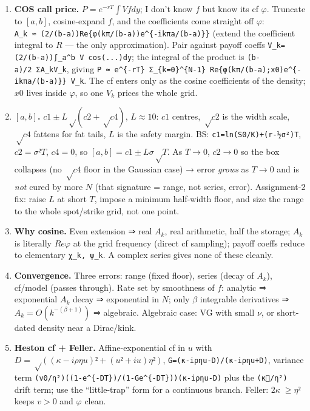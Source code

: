 \documentclass[
  11pt,
]{article}
\begin{document}
\begin{enumerate}
\def\labelenumi{\arabic{enumi}.}
\item
  \textbf{COS call price.} \(P = e^{-rT}∫V f dy\); I don't know \(f\)
  but know its cf \(φ\). Truncate to \([a,b]\), cosine-expand \(f\), and
  the coefficients come straight off \(φ\):
  \texttt{A\_k\ ≈\ (2/(b-a))Re\{φ(kπ/(b-a))e\^{}\{-ikπa/(b-a)\}\}}
  (extend the coefficient integral to \(R\) --- the only approximation).
  Pair against payoff coeffs
  \texttt{V\_k=(2/(b-a))∫\_a\^{}b\ V\ cos(...)dy}; the integral of the
  product is \texttt{(b-a)/2\ Σ\textquotesingle{}A\_kV\_k}, giving
  \texttt{P\ ≈\ e\^{}\{-rT\}\ Σ\textquotesingle{}\_\{k=0\}\^{}\{N-1\}\ Re\{φ(kπ/(b-a);x0)e\^{}\{-ikπa/(b-a)\}\}\ V\_k}.
  The cf enters only as the cosine coefficients of the density; \(x0\)
  lives inside \(φ\), so one \({V_k}\) prices the whole grid.
\item
  \textbf{\([a,b]\).} \(c1 ± L√(c2+√c4)\), \(L≈10\): \(c1\) centres,
  \(√c2\) is the width scale, \(√c4\) fattens for fat tails, \(L\) is
  the safety margin. BS: \texttt{c1=ln(S0/K)+(r-½σ²)T}, \(c2=σ²T\),
  \(c4=0\), so \([a,b]=c1±Lσ√T\). As \(T→0\), \(c2→0\) so the box
  collapses (no \(√c4\) floor in the Gaussian case) → error \emph{grows}
  as \(T→0\) and is \emph{not} cured by more \(N\) (that signature =
  range, not series, error). Assignment-2 fix: raise \(L\) at short
  \(T\), impose a minimum half-width floor, and size the range to the
  whole spot/strike grid, not one point.
\item
  \textbf{Why cosine.} Even extension ⇒ real \(A_k\), real arithmetic,
  half the storage; \(A_k\) is literally \(Re{φ}\) at the grid frequency
  (direct cf sampling); payoff coeffs reduce to elementary
  \texttt{χ\_k,\ ψ\_k}. A complex series gives none of these cleanly.
\item
  \textbf{Convergence.} Three errors: range (fixed floor), series (decay
  of \(A_k\)), cf/model (passes through). Rate set by smoothness of
  \(f\): analytic ⇒ exponential \(A_k\) decay ⇒ exponential in \(N\);
  only \(β\) integrable derivatives ⇒ \(A_k=O(k^{-(β+1)})\) ⇒ algebraic.
  Algebraic case: VG with small \(ν\), or short-dated density near a
  Dirac/kink.
\item
  \textbf{Heston cf + Feller.} Affine-exponential cf in \(u\) with
  \(D=√((κ-iρηu)²+(u²+iu)η²)\), \texttt{G=(κ-iρηu-D)/(κ-iρηu+D)},
  variance term
  \texttt{(v0/η²)((1-e\^{}\{-DT\})/(1-Ge\^{}\{-DT\}))(κ-iρηu-D)} plus
  the \texttt{(κ/η²)} drift term; use the ``little-trap'' form for a
  continuous branch. Feller: \(2κ ≥ η²\) keeps \(v>0\) and \(φ\) clean.

\end{enumerate}
\end{document}
